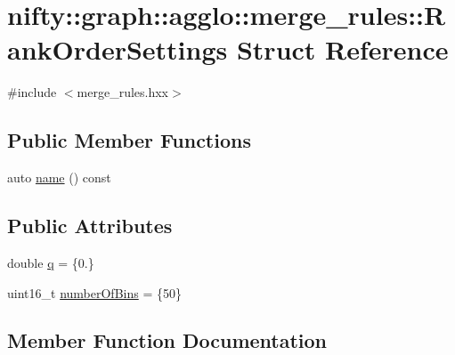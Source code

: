 \hypertarget{structnifty_1_1graph_1_1agglo_1_1merge__rules_1_1RankOrderSettings}{}\section{nifty\+:\+:graph\+:\+:agglo\+:\+:merge\+\_\+rules\+:\+:Rank\+Order\+Settings Struct Reference}
\label{structnifty_1_1graph_1_1agglo_1_1merge__rules_1_1RankOrderSettings}


{\ttfamily \#include $<$merge\+\_\+rules.\+hxx$>$}

\subsection*{Public Member Functions}
\begin{DoxyCompactItemize}
\item 
auto \hyperlink{structnifty_1_1graph_1_1agglo_1_1merge__rules_1_1RankOrderSettings_a84f08fefe15e4deb7a422666fe555864}{name} () const
\end{DoxyCompactItemize}
\subsection*{Public Attributes}
\begin{DoxyCompactItemize}
\item 
double \hyperlink{structnifty_1_1graph_1_1agglo_1_1merge__rules_1_1RankOrderSettings_a7d797fddbf59511e6a6a0f1d25118ab3}{q} = \{0.\}
\item 
uint16\+\_\+t \hyperlink{structnifty_1_1graph_1_1agglo_1_1merge__rules_1_1RankOrderSettings_aa585ca19731345b87f25da636ba6759b}{number\+Of\+Bins} = \{50\}
\end{DoxyCompactItemize}


\subsection{Member Function Documentation}
\mbox{\label{structnifty_1_1graph_1_1agglo_1_1merge__rules_1_1RankOrderSettings_a84f08fefe15e4deb7a422666fe555864}} 

